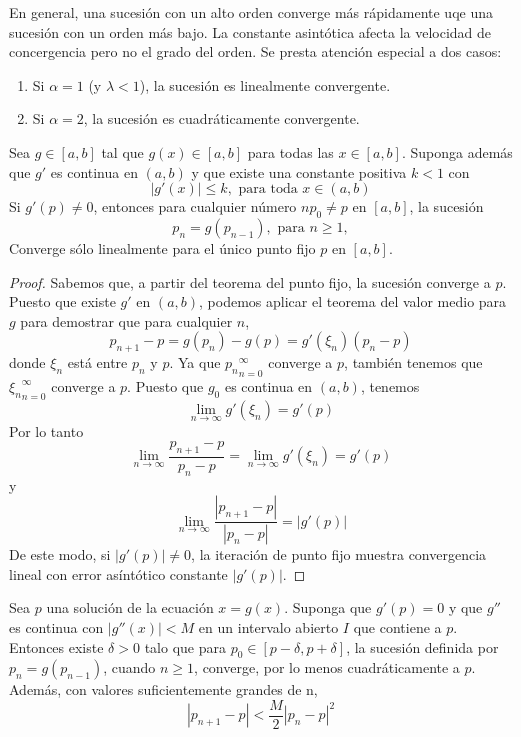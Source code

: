 En general, una sucesión con un alto orden converge más rápidamente uqe una sucesión con un orden más bajo. La constante asintótica afecta la velocidad de concergencia pero no el grado del orden. Se presta atención especial a dos casos:
\begin{enumerate}
    \item Si $\alpha = 1$ (y $\lambda < 1$), la sucesión es linealmente convergente.
    \item Si $\alpha = 2$, la sucesión es cuadráticamente convergente.
\end{enumerate}

\begin{theorem}
    Sea $g \in [a, b]$ tal que $g(x) \in [a, b]$ para todas las $x \in [a, b]$. Suponga además que $g'$ es continua en $(a, b)$ y que existe una constante positiva $k < 1$ con 
    \[ |g'(x)| \leq k, \text{ para toda } x \in (a, b)\]
    Si $g'(p) \neq 0$, entonces para cualquier número $np_0 \neq p$ en $[a, b]$, la sucesión
    \[ p_n = g(p_{n - 1}), \text{ para } n \geq 1,\]
    Converge sólo linealmente para el único punto fijo $p$ en $[a, b]$.
\end{theorem}

\begin{proof}
    Sabemos que, a partir del teorema del punto fijo, la sucesión converge a $p$. Puesto que existe $g'$ en $(a, b)$, podemos aplicar el teorema del valor medio para $g$ para demostrar que para cualquier $n$,
    \[ p_{n + 1} - p = g(p_n) - g(p) = g'(\xi_n) (p_n - p) \]
    donde $\xi_n$ está entre $p_n$ y $p$. Ya que ${p_n}_{n = 0}^\infty$ converge a $p$, también tenemos que ${\xi_n}_{n = 0}^\infty$ converge a $p$. Puesto que $g_0$ es continua en $(a, b)$, tenemos
    \[ \lim_{n \rightarrow \infty} g'(\xi_n) = g'(p) \]
    Por lo tanto
    \[ \lim_{n \rightarrow \infty} \frac{p_{n + 1} - p}{p_n  - p} = \lim_{n \rightarrow \infty} g'(\xi_n) = g'(p) \]
    y
    \[ \lim_{n \rightarrow \infty} \frac{|p_{n + 1} - p|}{|p_n - p|} = |g'(p)|\]
    De este modo, si $|g'(p)| \neq 0$, la iteración de punto fijo muestra convergencia lineal con error asíntótico constante $|g'(p)|$.
\end{proof}

\begin{theorem}
    Sea $p$ una solución de la ecuación $x = g(x)$. Suponga que $g'(p) = 0$ y que $g''$ es continua con $|g''(x)| < M$ en un intervalo abierto $I$ que contiene a $p$. Entonces existe $\delta > 0$ talo que para $p_0 \in [p - \delta, p + \delta]$, la sucesión definida por $p_n = g(p_{n - 1})$, cuando $n \geq 1$, converge, por lo menos cuadráticamente a $p$. Además, con valores suficientemente grandes de n,
    \[ |p_{n + 1} - p| < \frac{M}{2} |p_n - p|^2 \]
\end{theorem}


